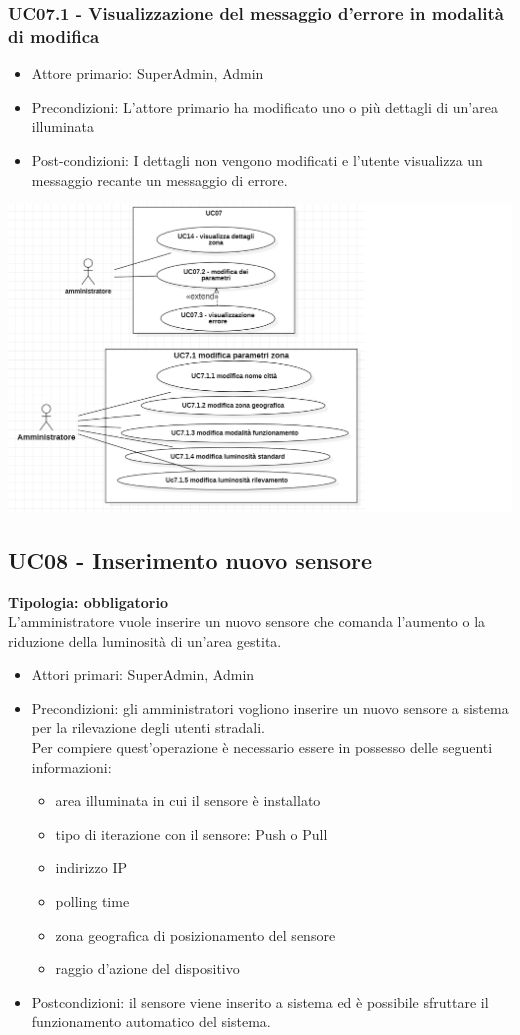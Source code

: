 \documentclass[12pt]{article}
\begin{document}
\subsubsection{UC07.1 - Visualizzazione del messaggio d'errore in modalità di modifica}
\begin{itemize}
	\item Attore primario: SuperAdmin, Admin
	\item Precondizioni: L'attore primario ha modificato uno o più dettagli di un'area illuminata
	\item Post-condizioni: I dettagli non vengono modificati e l'utente visualizza un messaggio recante un messaggio di errore.
\end{itemize}

\includegraphics[scale=0.5]{UC07.png}

\subsection{UC08 - Inserimento nuovo sensore}
\textbf{Tipologia: obbligatorio}\\
L'amministratore vuole inserire un nuovo sensore che comanda l'aumento o la riduzione della luminosità di un'area gestita.
\begin{itemize}
	\item Attori primari: SuperAdmin, Admin
	\item Precondizioni: gli amministratori vogliono inserire un nuovo sensore a sistema per la rilevazione degli utenti stradali.\\
	 Per compiere quest'operazione è necessario essere in possesso delle seguenti informazioni: 
	\begin{itemize}
		\item area illuminata in cui il sensore è installato
		\item tipo di iterazione con il sensore: Push o Pull
		\item indirizzo IP
		\item polling time
		\item zona geografica di posizionamento del sensore
		\item raggio d'azione del dispositivo
	\end{itemize}
	\item Postcondizioni: il sensore viene inserito a sistema ed è possibile sfruttare il funzionamento automatico del sistema.
\end{itemize}
\end{document}
